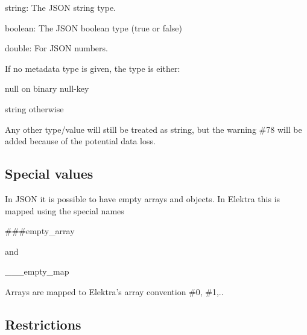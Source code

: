 \begin{DoxyItemize}
\item {\ttfamily string}\+: The J\+S\+ON string type.
\item {\ttfamily boolean}\+: The J\+S\+ON boolean type (true or false)
\item {\ttfamily double}\+: For J\+S\+ON numbers.
\end{DoxyItemize}

If no metadata {\ttfamily type} is given, the type is either\+:


\begin{DoxyItemize}
\item {\ttfamily null} on binary null-\/key
\item {\ttfamily string} otherwise
\end{DoxyItemize}

Any other type/value will still be treated as string, but the warning {\ttfamily \#78} will be added because of the potential data loss.

\subsection*{Special values}

In J\+S\+ON it is possible to have empty arrays and objects. In Elektra this is mapped using the special names


\begin{DoxyCode}
###empty\_array
\end{DoxyCode}


and


\begin{DoxyCode}
\_\_\_empty\_map
\end{DoxyCode}


Arrays are mapped to Elektra’s array convention \#0, \#1,..

\subsection*{Restrictions}


